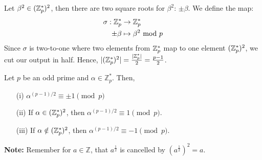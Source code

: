 \begin{Proof}
    Let $\beta^2\in(\mathbb{Z}_p^*)^2$, then there are two square roots for $\beta^2$: $\pm\beta$. We define the map:
    \begin{align*}
        \sigma: \mathbb{Z}_p^* &\to \mathbb{Z}_p^*\\
        \pm\beta &\mapsto \beta^2 \text{ mod } p
    \end{align*}
    Since $\sigma$ is two-to-one where two elements from $\mathbb{Z}_p^*$ map to one element $(\mathbb{Z}_p^*)^2$, we cut our output in half.
    Hence, $|(\mathbb{Z}_p^*)^2|=\frac{|\mathbb{Z}_p^*|}{2}=\frac{p-1}{2}$.
\end{Proof}

\newpage




\begin{theo}

    \label{theo:euler_criterion}
    Let $p$ be an odd prime and $\alpha\in\mathbb{Z}_p^*$. Then,
    \begin{enumerate}
        \item[(i)] $\alpha^{(p-1)/2} \equiv \pm1 \pmod{p}$
        \item[(ii)] If $\alpha\in(\mathbb{Z}_p^*)^2$, then $\alpha^{(p-1)/2}\equiv 1\pmod{p}$.
        \item[(iii)] If $\alpha\notin(\mathbb{Z}_p^*)^2$, then $\alpha^{(p-1)/2}\equiv -1\pmod{p}$.
    \end{enumerate}
\end{theo}

\begin{Note}
    \textbf{Note:} Remember for $a\in\mathbb{Z}$, that $a^\frac{1}{2}$ is cancelled by $(a^\frac{1}{2})^2=a$.
\end{Note}


